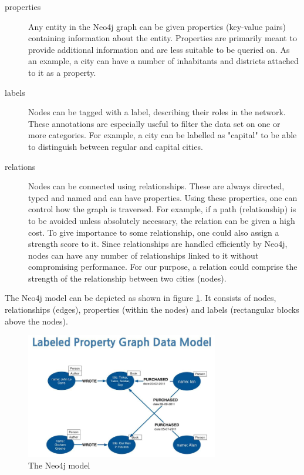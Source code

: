 \begin{description}
\item[properties] Any entity in the Neo4j graph can be given properties (key-value pairs) containing information about the entity. Properties are primarily meant to provide additional information and are less suitable to be queried on. As an example, a city can have a number of inhabitants and districts attached to it as a property.
\item[labels] Nodes can be tagged with a label, describing their roles in the network. These annotations are especially useful to filter the data set on one or more categories. For example, a city can be labelled as "capital" to be able to distinguish between regular and capital cities.
\item[relations] Nodes can be connected using relationships. These are always directed, typed and named and can have properties. Using these properties, one can control how the graph is traversed. For example, if a path (relationship) is to be avoided unless absolutely necessary, the relation can be given a high cost. To give importance to some relationship, one could also assign a strength score to it. Since relationships are handled efficiently by Neo4j, nodes can have any number of relationships linked to it without compromising performance. For our purpose, a relation could comprise the strength of the relationship between two cities (nodes).
\end{description}

The Neo4j model can be depicted as shown in figure \ref{fig:neo4j}. It consists of nodes, relationships (edges), properties (within the nodes) and labels (rectangular blocks above the nodes).

\begin{figure}[h]
\centering
\includegraphics[width=0.75\textwidth]{neo4j}
\caption{The Neo4j model \protect\footnotemark{}}
\label{fig:neo4j}
\end{figure}

